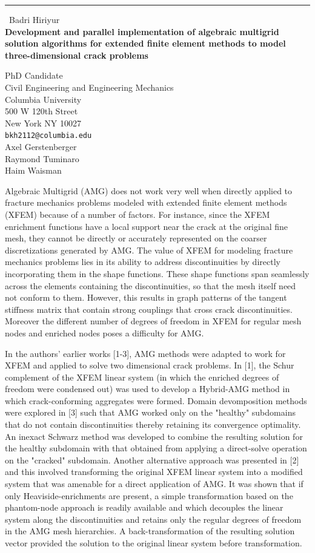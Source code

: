 \documentclass{report}
\begin{document}
\begin{center}
\rule{6in}{1pt} \
{\large Badri Hiriyur \\
{\bf Development and parallel implementation of algebraic multigrid solution algorithms for extended finite element methods to model three-dimensional crack problems}}

PhD Candidate \\ Civil Engineering and Engineering Mechanics \\ Columbia University \\ 500 W 120th Street \\ New York NY 10027
\\
{\tt bkh2112@columbia.edu}\\
Axel Gerstenberger\\
Raymond Tuminaro\\
Haim Waisman\end{center}

Algebraic Multigrid (AMG) does not work very well when directly applied
to fracture mechanics problems modeled with extended finite element
methods (XFEM) because of a number of factors. For instance, since the
XFEM enrichment functions have a local support near the crack at the
original fine mesh, they cannot be directly or accurately represented on
the coarser discretizations generated by AMG. The value of XFEM for
modeling fracture mechanics problems lies in its ability to address
discontinuities by directly incorporating them in the shape functions.
These shape functions span seamlessly across the elements containing the
discontinuities, so that the mesh itself need not conform to them.
However, this results in graph patterns of the tangent stiffness matrix
that contain strong couplings that cross crack discontinuities. Moreover
the different number of degrees of freedom in XFEM for regular mesh nodes
and enriched nodes poses a difficulty for AMG.

In the authors' earlier works [1-3], AMG methods were adapted to work for
XFEM and applied to solve two dimensional crack problems. In [1], the
Schur complement of the XFEM linear system (in which the enriched degrees
of freedom were condensed out) was used to develop a Hybrid-AMG method in
which crack-conforming aggregates were formed. Domain devomposition
methods were explored in [3] such that AMG worked only on the "healthy"
subdomains that do not contain discontinuities thereby retaining its
convergence optimality. An inexact Schwarz method was developed to
combine the resulting solution for the healthy subdomain with that
obtained from applying a direct-solve operation on the "cracked"
subdomain. Another alternative approach was presented in [2] and this
involved transforming the original XFEM linear system into a modified
system that was amenable for a direct application of AMG. It was shown
that if only Heaviside-enrichments are present, a simple transformation
based on the phantom-node approach is readily available and which
decouples the linear system along the discontinuities and retains only
the regular degrees of freedom in the AMG mesh hierarchies. A
back-transformation of the resulting solution vector provided the
solution to the original linear system before transformation.
\end{document}
